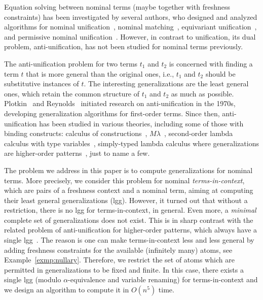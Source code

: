 \documentclass[11pt,a4paper]{amsart}
\theoremstyle{definition}
\begin{document}
Equation solving between nominal terms (maybe together with freshness
constraints) has been investigated by several authors, who designed
and analyzed algorithms for nominal
unification~\cite{DBLP:journals/tcs/UrbanPG04,
  DBLP:conf/rta/LevyV08, DBLP:conf/rta/LevyV10,
  DBLP:journals/tocl/LevyV12, DBLP:journals/tcs/CalvesF08,
  CalvesThesis}, nominal matching~\cite{DBLP:journals/jcss/CalvesF10},
equivariant unification~\cite{DBLP:journals/jar/Cheney10}, and permissive
nominal unification~\cite{dowek09,DBLP:journals/igpl/DowekGM10}. However, in
contrast to unification, its dual problem, anti-unification, has not
been studied for nominal terms previously. 



The anti-unification problem for two terms $t_1$ and $t_2$ is
concerned with finding a term $t$ that is more general than the
original ones, i.e., $t_1$ and $t_2$ should be substitutive instances
of $t$. The interesting generalizations are the least general ones,
which retain the common structure of $t_1$ and $t_2$ as much as
possible. Plotkin~\cite{Plotkin70} and Reynolds~\cite{Reynolds70}
initiated research on anti-unification in the 1970s, developing
generalization algorithms for first-order terms. Since then,
anti-unification has been studied in various theories, including some
of those with binding constructs: calculus of
constructions~\cite{DBLP:conf/lics/Pfenning91},
$M\lambda$~\cite{DBLP:conf/icml/FengM92}, second-order lambda calculus
with type variables~\cite{DBLP:journals/amai/LuMHH00}, simply-typed
lambda calculus where generalizations are higher-order
patterns~\cite{DBLP:conf/rta/BaumgartnerKLV13}, just to name a few.

The problem we address in this paper is to compute generalizations for
nominal terms. More precisely, we consider this problem for nominal
\emph{terms-in-context}, which are pairs of a freshness context and a
nominal term, aiming at computing their least general generalizations
(lgg). However, it turned out that without a restriction, there is no
lgg for terms-in-context, in general. Even more, a \emph{minimal}
complete set of generalizations does not exist. This is in sharp
contrast with the related problem of anti-unification for higher-order
patterns, which always have a single
lgg~\cite{DBLP:conf/rta/BaumgartnerKLV13}. The reason is one can make
terms-in-context less and less general by adding freshness constraints
for the available (infinitely many) atoms, see
Example~\ref{exmp:nullary}.  Therefore, we restrict the set of atoms
which are permitted in generalizations to be fixed and finite. In this
case, there exists a single lgg (modulo $\alpha$-equivalence and
variable renaming) for terms-in-context and we design an algorithm to
compute it in $O(n^5)$ time.
\end{document}
